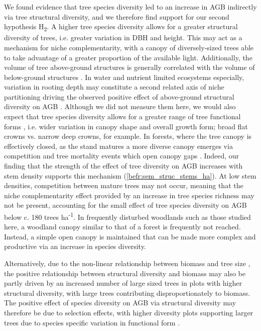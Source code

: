\begin{refsection}
We found evidence that tree species diversity led to an increase in AGB indirectly via tree structural diversity, and we therefore find support for our second hypothesis H\textsubscript{2}. A higher tree species diversity allows for a greater structural diversity of trees, i.e. greater variation in DBH and height. This may act as a mechanism for niche complementarity, with a canopy of diversely-sized trees able to take advantage of a greater proportion of the available light. Additionally, the volume of tree above-ground structures is generally correlated with the volume of below-ground structures \citep{Paul2019}. In water and nutrient limited ecosystems especially, variation in rooting depth may constitute a second related axis of niche partitioning driving the observed positive effect of above-ground structural diversity on AGB \citep{Kulmatiski2013}. Although we did not measure them here, we would also expect that tree species diversity allows for a greater range of tree functional forms \citep{Pretzsch2014}, i.e. wider variation in canopy shape and overall growth form; broad flat crowns vs. narrow deep crowns, for example. In forests, where the tree canopy is effectively closed, as the stand matures a more diverse canopy emerges via competition and tree mortality events which open canopy gaps \citep{Muscolo2014}. Indeed, our finding that the strength of the effect of tree diversity on AGB increases with stem density supports this mechanism (\autoref{befr:sem_struc_stems_ha}). At low stem densities, competition between mature trees may not occur, meaning that the niche complementarity effect provided by an increase in tree species richness may not be present, accounting for the small effect of tree species diversity on AGB below c. 180 trees ha\textsuperscript{-1}. In frequently disturbed woodlands such as those studied here, a woodland canopy similar to that of a forest is frequently not reached. Instead, a simple open canopy is maintained that can be made more complex and productive via an increase in species diversity.

Alternatively, due to the non-linear relationship between biomass and tree size \citep{Bastin2018}, the positive relationship between structural diversity and biomass may also be partly driven by an increased number of large sized trees in plots with higher structural diversity, with large trees contributing disproportionately to biomass. The positive effect of species diversity on AGB via structural diversity may therefore be due to selection effects, with higher diversity plots supporting larger trees due to species specific variation in functional form \citep{Diaz2015}.


\end{refsection}
